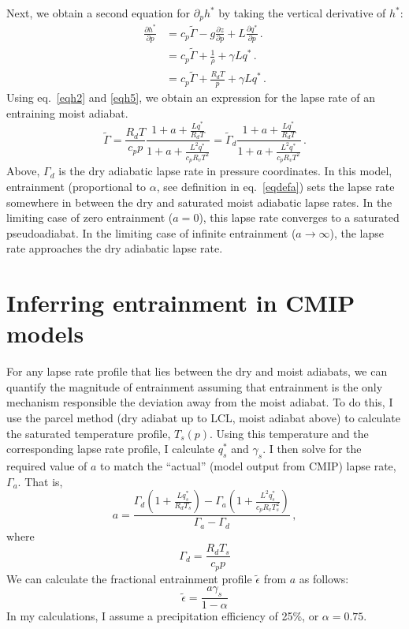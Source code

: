 \documentclass{article}
\begin{document}
Next, we obtain a second equation for $\partial_p h^*$ by taking the vertical derivative of $h^*$:
\begin{align}
\label{eqh3}
\frac{\partial h^*}{\partial p} &= c_p\tilde{\Gamma} - g\frac{\partial z}{\partial p} + L\frac{\partial q^*}{\partial p} \, . \\
\label{eqh4}
&= c_p\tilde{\Gamma} + \frac{1}{\rho} + \gamma Lq^* \, . \\
\label{eqh5}
&= c_p\tilde{\Gamma} + \frac{R_dT}{p} + \gamma Lq^* \, .
\end{align}
Using eq.~\ref{eqh2} and \ref{eqh5}, we obtain an expression for the lapse rate of an entraining moist adiabat.
\begin{equation}
\tilde{\Gamma} = \frac{R_dT}{c_pp}\frac{1 + a + \frac{Lq^*}{R_dT}}{1 + a + \frac{L^2q^*}{c_pR_vT^2}} = \tilde{\Gamma}_d\frac{1 + a + \frac{Lq^*}{R_dT}}{1 + a + \frac{L^2q^*}{c_pR_vT^2}} \, .
\end{equation}
Above, $\Gamma_d$ is the dry adiabatic lapse rate in pressure coordinates. In this model, entrainment (proportional to $\alpha$, see definition in eq.~\ref{eqdefa}) sets the lapse rate somewhere in between the dry and saturated moist adiabatic lapse rates. In the limiting case of zero entrainment ($a=0$), this lapse rate converges to a saturated pseudoadiabat. In the limiting case of infinite entrainment ($a\rightarrow\infty$), the lapse rate approaches the dry adiabatic lapse rate.

\section{Inferring entrainment in CMIP models}
For any lapse rate profile that lies between the dry and moist adiabats, we can quantify the magnitude of entrainment assuming that entrainment is the only mechanism responsible the deviation away from the moist adiabat. To do this, I use the parcel method (dry adiabat up to LCL, moist adiabat above) to calculate the saturated temperature profile, $T_s(p)$. Using this temperature and the corresponding lapse rate profile, I calculate $q^*_s$ and $\gamma_s$. I then solve for the required value of $a$ to match the ``actual'' (model output from CMIP) lapse rate, $\Gamma_a$. That is,
\begin{equation}
a = \frac{\Gamma_d\left(1+\frac{Lq_s^*}{R_dT_s}\right) - \Gamma_a\left(1+\frac{L^2q_s^*}{c_pR_vT_s^2}\right)}{\Gamma_a - \Gamma_d} \, ,
\end{equation}
where
\begin{equation}
\Gamma_d = \frac{R_dT_s}{c_pp}
\end{equation}
We can calculate the fractional entrainment profile $\tilde{\epsilon}$ from $a$ as follows:
\begin{equation}
\tilde{\epsilon} = \frac{a\gamma_s}{1-\alpha}
\end{equation}
In my calculations, I assume a precipitation efficiency of 25\%, or $\alpha=0.75$.
\end{document}
